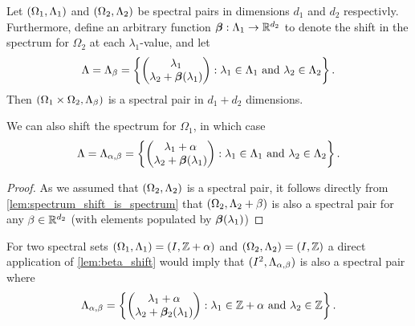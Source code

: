 \documentclass[../thesis.tex]{subfiles}
\begin{document}


\begin{lemma}\label{lem:beta_shift}
    Let $(\Omega_1,\Lambda_1)$ and $(\Omega_2,\Lambda_2)$ be spectral pairs in dimensions $d_1$ and $d_2$ respectivly. Furthermore, define an arbitrary function $\bm{\beta}: \Lambda_1 \rightarrow \mathbb{R}^{d_2}$ to denote the shift in the spectrum for $\Omega_2$ at each $\lambda_1$-value, and let
    \begin{equation}
        \Lambda = \Lambda_\beta
        = \left\{\begin{pmatrix}
            \lambda_1 \\
            \lambda_2+\bm{\beta}(\lambda_1)
            \end{pmatrix}
        : \lambda_1 \in \Lambda_1 \text{ and } \lambda_2 \in \Lambda_2\right\}.
    \end{equation}
    Then $(\Omega_1 \times \Omega_2,\Lambda_\beta)$ is a spectral pair in $d_1+d_2$ dimensions. 
\end{lemma}
\begin{remark}
    We can also shift the spectrum for $\Omega_1$, in which case
    \begin{equation*}
        \Lambda = \Lambda_{\alpha,\beta} 
        = \left\{\begin{pmatrix}
            \lambda_1 +\alpha\\
            \lambda_2+\bm{\beta}(\lambda_1)
            \end{pmatrix}
        : \lambda_1 \in \Lambda_1 \text{ and } \lambda_2 \in \Lambda_2\right\}.
    \end{equation*}
\end{remark}
\begin{proof}
    As we assumed that $(\Omega_2,\Lambda_2)$ is a spectral pair, it follows directly from \cref{lem:spectrum_shift_is_spectrum} that $(\Omega_2,\Lambda_2+\beta)$ is also a spectral pair for any $\beta \in \mathbb{R}^{d_2}$ (with elements populated by $\bm{\beta}(\lambda_1)$)
\end{proof}

\begin{example}
    For two spectral sets $(\Omega_1,\Lambda_1)=(I, \mathbb{Z}+\alpha)$ and $(\Omega_2,\Lambda_2)=(I, \mathbb{Z})$ a direct application of \cref{lem:beta_shift} would imply that $(I^2,\Lambda_{\alpha,\beta})$ is also a spectral pair where
    \begin{equation*}
        \Lambda_{\alpha,\beta} 
        = \left\{\begin{pmatrix}
            \lambda_1 +\alpha\\
            \lambda_2+\bm{\beta}_2(\lambda_1)
            \end{pmatrix}
        : \lambda_1 \in \mathbb{Z} +\alpha \text{ and } \lambda_2 \in \mathbb{Z}\right\}. \qedhere
    \end{equation*}
\end{example}
\end{document}
